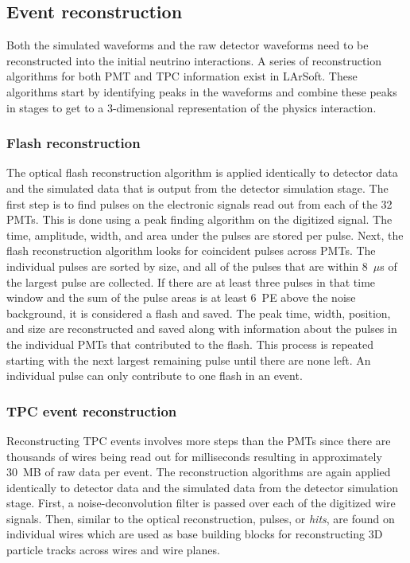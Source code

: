 \subsection{Event reconstruction}\label{sec:reco}
Both the simulated waveforms and the raw detector waveforms need to be
reconstructed into the initial neutrino interactions. A series of
reconstruction algorithms for both PMT and TPC information exist in LArSoft.
These algorithms start by identifying peaks in the waveforms and combine these
peaks in stages to get to a 3-dimensional representation of the physics
interaction.

  \subsubsection{Flash reconstruction}\label{sec:flashreco}
    The optical flash reconstruction algorithm is applied identically to
    detector data and the simulated data that is output from the detector
    simulation stage.  The first step is to find pulses on the electronic
    signals read out from each of the 32 PMTs. This is done using a peak
    finding algorithm on the digitized signal. The time, amplitude, width, and
    area under the pulses are stored per pulse. Next, the flash reconstruction
    algorithm looks for coincident pulses across PMTs. The individual pulses
    are sorted by size, and all of the pulses that are within 8~$\mu$s of the
    largest pulse are collected. If there are at least three pulses in that
    time window and the sum of the pulse areas is at least 6~PE above the noise
    background, it is considered a flash and saved. The peak time, width,
    position, and size are reconstructed and saved along with information about
    the pulses in the individual PMTs that contributed to the flash. This
    process is repeated starting with the next largest remaining pulse until
    there are none left. An individual pulse can only contribute to one flash
    in an event.

  \subsubsection{TPC event reconstruction}\label{sec:tpcreco}
    Reconstructing TPC events involves more steps than the PMTs since there are
    thousands of wires being read out for milliseconds resulting in
    approximately 30~MB of raw data per event. The reconstruction algorithms
    are again applied identically to detector data and the simulated data from
    the detector simulation stage. First, a noise-deconvolution filter is
    passed over each of the digitized wire signals. Then, similar to the
    optical reconstruction, pulses, or \textit{hits}, are found on individual
    wires which are used as base building blocks for reconstructing 3D particle
    tracks across wires and wire planes.

